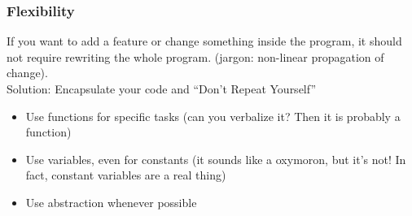 \begin{frame}[fragile]
  \frametitle{Flexibility}
    If you want to add a feature or change something inside the program, it should not require rewriting the whole program. (jargon: non-linear propagation of change).\\
    
    Solution: Encapsulate your code and “Don’t Repeat Yourself”
    \begin{itemize}
        \item Use functions for specific tasks (can you verbalize it? Then it is probably a function)
        \item Use variables, even for constants (it sounds like a oxymoron, but it’s not! In fact, constant variables are a real thing)
        \item Use abstraction whenever possible
    \end{itemize}
\end{frame}



